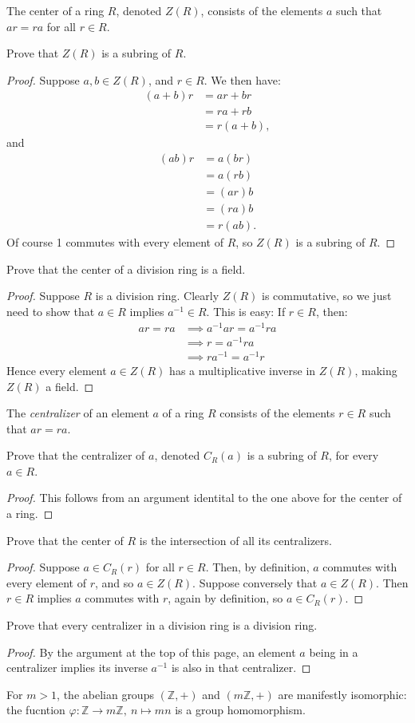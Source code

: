 \documentclass[12pt]{article}
\newenvironment{problem}[2][Problem]{\begin{trivlist}
\item[\hskip \labelsep {\bfseries #1}\hskip \labelsep {\bfseries #2.}]}{\end{trivlist}}
\theoremstyle{remark}
\begin{document}
\begin{problem}{2.9}
  The center of a ring $R$, denoted $Z(R)$, consists of the elements $a$ such that $ar=ra$ for all $r\in R$.
\end{problem}
Prove that $Z(R)$ is a subring of $R$.
\begin{proof}
  Suppose $a,b\in Z(R)$, and $r\in R$.
  We then have:
    \begin{align*}
      (a+b)r &= ar+br\\
      &= ra+rb\\
      &= r(a+b),
    \end{align*}
  and
    \begin{align*}
      (ab)r &= a(br)\\
      &= a(rb)\\
      &= (ar)b\\
      &= (ra)b\\
      &= r(ab).
    \end{align*}
  Of course 1 commutes with every element of $R$, so $Z(R)$ is a subring of $R$.
\end{proof}
Prove that the center of a division ring is a field.
\begin{proof}
  Suppose $R$ is a division ring.
  Clearly $Z(R)$ is commutative, so we just need to show that $a\in R$ implies $a^{-1}\in R$.
  This is easy: If $r\in R$, then:
    \begin{align*}
      ar=ra &\implies a^{-1}ar = a^{-1}ra \\
      &\implies r = a^{-1}ra \\
      &\implies ra^{-1} = a^{-1}r
    \end{align*}
  Hence every element $a\in Z(R)$ has a multiplicative inverse in $Z(R)$, making $Z(R)$ a field.
\end{proof}

\begin{problem}{2.10}
  The \textit{centralizer} of an element $a$ of a ring $R$ consists of the elements $r\in R$
  such that $ar=ra$.
\end{problem}
  Prove that the centralizer of $a$, denoted $C_R(a)$ is a subring of $R$, for every $a\in R$.
\begin{proof}
  This follows from an argument identital to the one above for the center of a ring.
\end{proof}
  Prove that the center of $R$ is the intersection of all its centralizers.
\begin{proof}
  Suppose $a\in C_R(r)$ for all $r\in R$.
  Then, by definition, $a$ commutes with every element of $r$, and so $a\in Z(R)$.
  Suppose conversely that $a\in Z(R)$.
  Then $r\in R$ implies $a$ commutes with $r$, again by definition, so $a\in C_R(r)$.
\end{proof}
  Prove that every centralizer in a division ring is a division ring.
\begin{proof}
  By the argument at the top of this page, an element $a$ being in a centralizer implies its
  inverse $a^{-1}$ is also in that centralizer.
\end{proof}

\begin{problem}{2.15}
For $m>1$, the abelian groups $(\mathbb{Z}, +)$ and $(m\mathbb{Z},+)$ are manifestly isomorphic:
the fucntion $\varphi:\mathbb{Z}\to m\mathbb{Z},\ n\mapsto mn$ is a group homomorphism.
\end{problem}
\end{document}
